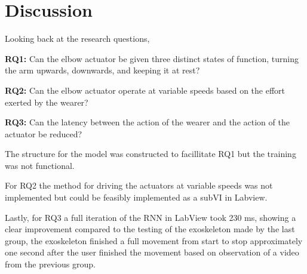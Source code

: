 \section{Discussion}
\label{section:disc}

Looking back at the research questions,

\textbf{RQ1:} Can the elbow actuator be given three distinct states of function, turning the arm upwards, downwards, and keeping it at rest?

\textbf{RQ2:} Can the elbow actuator operate at variable speeds based on the effort exerted by the wearer?

\textbf{RQ3:} Can the latency between the action of the wearer and the action of the actuator be reduced?

The structure for the model was constructed to facillitate RQ1 but the training was not functional.

For RQ2 the method for driving the actuators at variable speeds was not implemented but could be feasibly implemented as a subVI in Labview.  

Lastly, for RQ3 a full iteration of the RNN in LabView took 230 ms, showing a clear improvement compared to the testing of the exoskeleton 
made by the last group, the exoskeleton finished a full movement from start to stop approximately one second after the user finished the 
movement based on observation of a video from the previous group.
